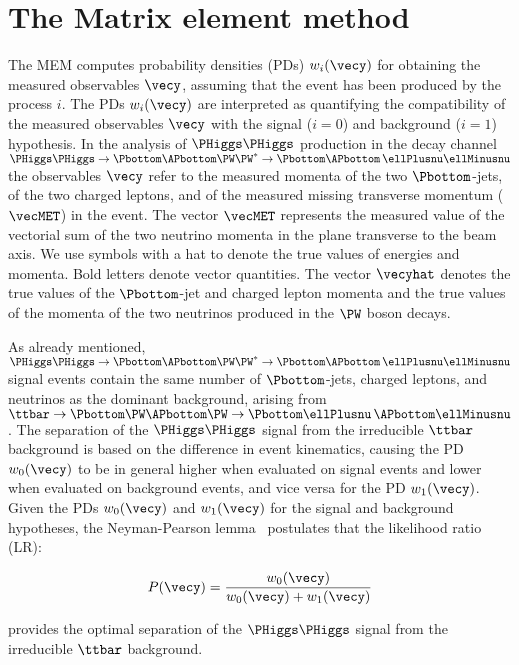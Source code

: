 \section{The Matrix element method}
\label{sec:mem}

The MEM computes probability densities (PDs) $w_{i}(\vecy)$
for obtaining the measured observables $\vecy$, assuming that the event has been produced by the process $i$.
The PDs $w_{i}(\vecy)$ are interpreted as quantifying the compatibility of the measured observables $\vecy$
with the signal ($i=0$) and background ($i=1$) hypothesis.
In the analysis of $\PHiggs\PHiggs$ production in the decay channel 
$\PHiggs\PHiggs \to \Pbottom\APbottom\PW\PW^{\ast} \to \Pbottom\APbottom \, \ellPlusnu\ellMinusnu$
the observables $\vecy$ refer to 
the measured momenta of the two $\Pbottom$-jets, of the two charged leptons, and of the measured missing transverse momentum ($\vecMET$) in the event.
The vector $\vecMET$ represents the measured value of the vectorial sum of the two neutrino momenta in the plane transverse to the beam axis.
We use symbols with a hat to denote the true values of energies and momenta.
Bold letters denote vector quantities.
The vector $\vecyhat$ denotes the true values of the $\Pbottom$-jet and charged lepton momenta and the true values of the momenta of the two neutrinos produced in the $\PW$ boson decays.

As already mentioned, $\PHiggs\PHiggs \to \Pbottom\APbottom\PW\PW^{\ast} \to \Pbottom\APbottom \, \ellPlusnu\ellMinusnu$ signal events
contain the same number of $\Pbottom$-jets, charged leptons, and neutrinos as the dominant background,
arising from $\ttbar \to \Pbottom\PW\APbottom\PW \to \Pbottom\ellPlusnu \, \APbottom\ellMinusnu$.
The separation of the $\PHiggs\PHiggs$ signal from the irreducible $\ttbar$ background is based on the difference in event kinematics,
causing the PD $w_{0}(\vecy)$ to be in general higher when evaluated on signal events
and lower when evaluated on background events, and vice versa for the PD $w_{1}(\vecy)$.
Given the PDs $w_{0}(\vecy)$ and $w_{1}(\vecy)$ for the signal and background hypotheses,
the Neyman-Pearson lemma~\cite{Neyman:1937uhy} postulates that the likelihood ratio (LR):
\begin{linenowrapper}
\begin{equation}
P(\vecy) = \frac{w_{0}(\vecy)}{w_{0}(\vecy) + w_{1}(\vecy)}
\label{eq:memLR}
\end{equation}
\end{linenowrapper}
provides the optimal separation of the $\PHiggs\PHiggs$ signal from the irreducible $\ttbar$ background.

